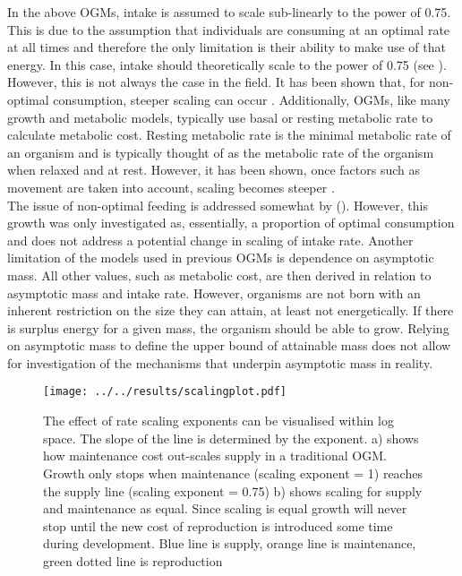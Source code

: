 \documentclass[a4paper, 11pt, hidelinks]{article} %
\begin{document}
	In the above OGMs, intake is assumed to scale sub-linearly to the power of 0.75.  This is due to the assumption that individuals are consuming at an optimal rate at all times and therefore the only limitation is their ability to make use of that energy.  In this case, intake should theoretically scale to the power of 0.75 (see \cite{West1997}).  However, this is not always the case in the field.  It has been shown that, for non-optimal consumption, steeper scaling can occur \parencite{Pawar2012, Peters1983}. Additionally, OGMs, like many growth and metabolic models, typically use basal or resting metabolic rate to calculate metabolic cost.  Resting metabolic rate is the minimal metabolic rate of an organism and is typically thought of as the metabolic rate of the organism when relaxed and at rest.  However, it has been shown, once factors such as movement are taken into account, scaling becomes steeper \parencite{Weibel2004}.
	\\
	The issue of non-optimal feeding is addressed somewhat by \citeauthor{Hou2011} (\citeyear{Hou2011}).  However, this growth was only investigated as, essentially, a proportion of optimal consumption and does not address a potential change in scaling of intake rate.
	Another limitation of the models used in previous OGMs is dependence on asymptotic mass.  
	All other values, such as metabolic cost, are then derived in relation to asymptotic mass and intake rate.  However, organisms are not born with an inherent restriction on the size they can attain, at least not energetically.  If there is surplus energy for a given mass, the organism should be able to grow.  Relying on asymptotic mass to define the upper bound of attainable mass does not allow for investigation of the mechanisms that underpin asymptotic mass in reality. 
	\begin{figure}[h!]
		\centering
		\texttt{[image: ../../results/scalingplot.pdf]}
		\caption{The effect of rate scaling exponents can be visualised within log space.  The slope of the line is determined by the exponent.  a) shows how maintenance cost out-scales supply in a traditional OGM.  Growth only stops when maintenance (scaling exponent = 1) reaches the supply line (scaling exponent = 0.75)  b) shows scaling for supply and maintenance as equal. Since scaling is equal growth will never stop until the new cost of reproduction is introduced some time during development.  Blue line is supply, orange line is maintenance, green dotted line is reproduction}
		\label{scaling_plot}
	\end{figure}
\end{document}
